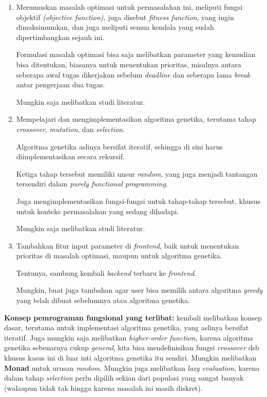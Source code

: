 \documentclass{article}
\begin{document}
\begin{enumerate}
    \item Merumuskan masalah optimasi untuk permasalahan ini, meliputi fungsi objektif \textit{(objective function)}, juga disebut \textit{fitness function}, yang ingin dimaksimumkan, dan juga meliputi semua kendala yang sudah dipertimbangkan sejauh ini.
    
    Formulasi masalah optimasi bisa saja melibatkan parameter yang kemudian bisa ditentukan, biasanya untuk menentukan prioritas, misalnya antara seberapa awal tugas dikerjakan sebelum \textit{deadline} dan seberapa lama \textit{break} antar pengerjaan dua tugas.
    
    Mungkin saja melibatkan studi literatur.

    \item Mempelajari dan mengimplementasikan algoritma genetika, terutama tahap \textit{crossover}, \textit{mutation}, dan \textit{selection}.
    
    Algoritma genetika aslinya bersifat iteratif, sehingga di sini harus diimplementasikan secara rekursif.

    Ketiga tahap tersebut memiliki unsur \textit{random}, yang juga menjadi tantangan tersendiri dalam \textit{purely functional programming}.
    
    Juga mengimplementasikan fungsi-fungsi untuk tahap-tahap tersebut, khusus untuk konteks permasalahan yang sedang dihadapi.

    Mungkin saja melibatkan studi literatur.

    \item Tambahkan fitur input parameter di \textit{frontend}, baik untuk menentukan prioritas di masalah optimasi, maupun untuk algoritma genetika.
    
    Tentunya, sambung kembali \textit{backend} terbaru ke \textit{frontend}.

    Mungkin, buat juga tambahan agar user bisa memilih antara algoritma \textit{greedy} yang telah dibuat sebelumnya atau algoritma genetika.
\end{enumerate}

\textbf{Konsep pemrograman fungsional yang terlibat:} kembali melibatkan konsep dasar, terutama untuk implementasi algoritma genetika, yang aslinya bersifat iteratif. Juga mungkin saja melibatkan \textit{higher-order function}, karena algoritma genetika sebenarnya cukup \textit{general}, kita bisa mendefinisikan fungsi \textit{crossover} dsb khusus kasus ini di luar inti algoritma genetika itu sendiri. Mungkin melibatkan \textbf{Monad} untuk urusan \textit{random}. Mungkin juga melibatkan \textit{lazy evaluation}, karena dalam tahap \textit{selection} perlu dipilih sekian dari populasi yang sangat banyak (walaupun tidak tak hingga karena masalah ini masih diskret).
\end{document}
